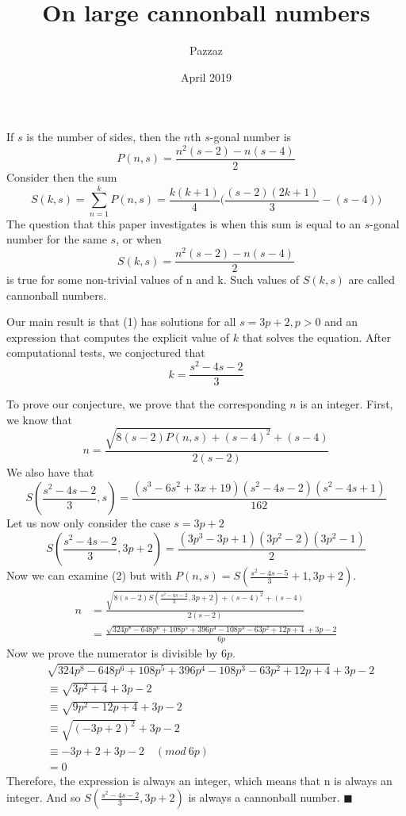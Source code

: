 \documentclass{article}
\title{On large cannonball numbers}
\author{Pazzaz}
\date{April 2019}
\begin{document}
\maketitle

If $s$ is the number of sides, then the $n$th $s$-gonal number is
$$
P(n, s) = \frac{n^2(s-2)-n(s-4)}{2}
$$
Consider then the sum
$$
S(k, s) = \sum_{n=1}^{k} P(n, s)=\frac{k(k+1)}{4}\Bigg(\frac{(s-2)(2k+1)}{3}-(s-4)\Bigg)
$$
The question that this paper investigates is when this sum is equal to an $s$-gonal number for the same $s$, or when
\begin{equation}
S(k, s) = \frac{n^2(s-2)-n(s-4)}{2}
\end{equation}
is true for some non-trivial values of n and k. Such values of $S(k, s)$ are called cannonball numbers.

Our main result is that (1) has solutions for all $s=3p+2, p>0$ and an expression that computes the explicit value of $k$ that solves the equation.
After computational tests, we conjectured that
$$
k= \frac{s^2-4s-2}{3}
$$

To prove our conjecture, we prove that the corresponding $n$ is an integer. First, we know that
\begin{equation}
n= \frac{\sqrt{8(s-2)P(n, s)+(s-4)^2}+(s-4)}{2(s-2)}
\end{equation}
We also have that
$$
S(\frac{s^2-4s-2}{3}, s)=\frac{(s^3-6s^2+3x+19)(s^2-4s-2)(s^2-4s+1)}{162}
$$
Let us now only consider the case $s=3p+2$
$$
S(\frac{s^2-4s-2}{3}, 3p+2)=\frac{\left(3p^3-3p+1\right)\left(3p^2-2\right)\left(3p^2-1\right)}{2}
$$
Now we can examine (2) but with $P(n, s)=S(\frac{s^2-4s-5}{3}+1, 3p+2)$.
\begin{equation*}
\begin{split}
n &= \frac{\sqrt{8(s-2)S(\frac{s^2-4s-2}{3}, 3p+2)+(s-4)^2}+(s-4)}{2(s-2)}\\&= \frac{\sqrt{324p^8-648p^6+108p^5+396p^4-108p^3-63p^2+12p+4}+3p-2}{6p}
\end{split}
\end{equation*}
Now we prove the numerator is divisible by $6p$.
\begin{equation*}
\begin{split}
&\sqrt{324p^8-648p^6+108p^5+396p^4-108p^3-63p^2+12p+4}+3p-2\\
&\equiv\sqrt{3p^2+4}+3p-2 \\
&\equiv\sqrt{9p^2-12p+4}+3p-2 \\
&\equiv\sqrt{(-3p+2)^2}+3p-2 \\
&\equiv-3p+2+3p-2\quad(mod\ 6p)\\
&=0
\end{split}
\end{equation*}
Therefore, the expression is always an integer, which means that n is always an integer. And so $S(\frac{s^2-4s-2}{3}, 3p+2)$ is always a cannonball number. $\blacksquare$
\end{document}
